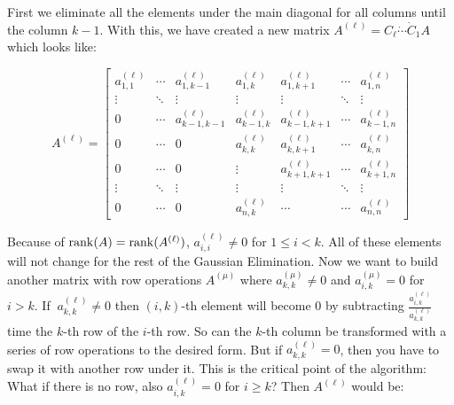 First we eliminate all the elements under the main diagonal for all columns until the column \(k - 1\).
With this, we have created a new matrix \(A^(\ell) = C_{\ell} \dot \cdots \dot C_1 A \) which looks
like:

\[
    A^{(\ell)} =
    \begin{bmatrix}
        a^{(\ell)}_{1,1} & \cdots & a^{(\ell)}_{1,k-1}   & a^{(\ell)}_{1,k}    & a^{(\ell)}_{1,k+1}   & \cdots & a^{(\ell)}_{1,n}    \\
        \vdots          & \ddots & \vdots               & \vdots             & \vdots               & \ddots & \vdots             \\
        0               & \cdots & a^{(\ell)}_{k-1,k-1} & a^{(\ell)}_{k-1,k} & a^{(\ell)}_{k-1,k+1} & \cdots & a^{(\ell)}_{k-1,n} \\
        0               & \cdots & 0                    & a^{(\ell)}_{k,k}    & a^{(\ell)}_{k,k+1}   & \cdots & a^{(\ell)}_{k,n}    \\
        0               & \cdots & 0                    & \vdots             & a^{(\ell)}_{k+1,k+1} & \cdots & a^{(\ell)}_{k+1,n} \\
        \vdots          & \ddots & \vdots               & \vdots             & \vdots               & \ddots & \vdots             \\
        0               & \cdots & 0                    & a^{(\ell)}_{n,k}    & \cdots               & \cdots & a^{(\ell)}_{n,n}
    \end{bmatrix}
\]

Because of \(\mathrm{rank}(A) = \mathrm{rank}(A^{(\ell)})\), \(a^{(\ell)}_{i,i} \ne 0\) for \(1 \le i < k\). All of these
elements will not change for the rest of the Gaussian Elimination. Now we want to build another matrix
with row operations \(A^{(\mu)}\) where \(a^{(\mu)}_{k,k} \ne 0\) and \(a^{(\mu)}_{i,k} = 0\) for \(i > k\).
If \(\ a^{(\ell)}_{k,k} \ne 0\) then \((i,k)\)-th element will become 0 by subtracting
\(\frac{a^{(\ell)}_{i,k}}{a^{(\ell)}_{k,k}}\) time the \(k\)-th row of the \(i\)-th row. So can the \(k\)-th
column be transformed with a series of row operations to the desired form. But if \(a^{(\ell)}_{k,k} = 0\),
then you have to swap it with another row under it. This is the critical point of the algorithm: What
if there is no row, also \(a^{(\ell)}_{i,k} = 0\) for \(i \ge k\)? Then \(A^{(\ell)}\) would be:


